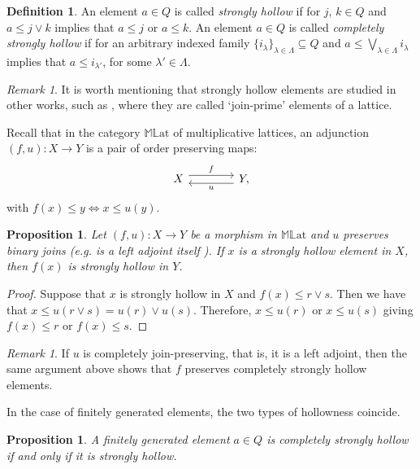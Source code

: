 \documentclass[11pt,english]{amsart}
\newtheorem{proposition}[theorem]{Proposition}
\theoremstyle{definition}
\newtheorem{definition}{Definition}[section]
\numberwithin{equation}{section}
\theoremstyle{remark}
\newtheorem{remark}[theorem]{Remark}
\def\leq{\leqslant}
\begin{document}
	\begin{definition}
		An element $a \in Q$ is called \emph{strongly hollow} if for $j$, $k\in Q$ and $a \leq j \vee k$ implies that $ a \leq j$ or $a \leq k$. An element $a \in Q$ is called \emph{completely strongly hollow} if for an arbitrary indexed family $\{i_\lambda\}_{\lambda \in \Lambda}\subseteq Q$ and $a \leq \bigvee_{\lambda \in \Lambda} i_\lambda$ implies that $a \leq i_{\lambda'}$, for some
		$\lambda' \in \Lambda$.
	\end{definition}
	
	\begin{remark}
		It is worth mentioning that strongly hollow elements are studied in other works, such as \cite{Abs-CIT}, where they are called `join-prime' elements of a lattice.
	\end{remark}
	
	Recall that in the category $\mathds{ML}\text{at}$  of multiplicative lattices, an adjunction $(f,u):X\rightarrow Y$ is a pair of order preserving maps:
	\[
	\begin{tikzcd}[column sep=4em] 
		X
		\arrow[r, shift left=.8ex, "f"] 
		& Y,
		\arrow[l, shift left=.8ex, swap, "u" below]
	\end{tikzcd}
	\]
	with $f(x)\leq y \Leftrightarrow x\leq u(y)$. 
	
	\begin{proposition}
		Let $(f,u):X\rightarrow Y$ be a morphism in $\mathds{ML}\text{at}$ and $u$ preserves binary joins (e.g. is a left adjoint itself ). If $x$ is a strongly hollow element in $X$, then $f(x)$ is strongly hollow in $Y$.
	\end{proposition}
	
	\begin{proof}
		Suppose that $x$ is strongly hollow in $X$ and $f(x)\leq r\vee s$. Then we have that $x\leq u(r\vee s)=u(r)\vee u(s)$. Therefore, $x\leq u(r)$ or $x\leq u(s)$ giving $f(x)\leq r$ or $f(x)\leq s$. 
	\end{proof}
	
	\begin{remark}
		If $u$ is completely join-preserving, that is, it is a left adjoint, then the same argument above shows that $f$ preserves completely strongly hollow elements.	
	\end{remark}
	In the case of finitely generated elements, the two types of hollowness coincide.
	
	\begin{proposition}
		A finitely generated element $a \in Q$ is completely strongly hollow if and only if it is strongly hollow.
	\end{proposition}
	
\end{document}
